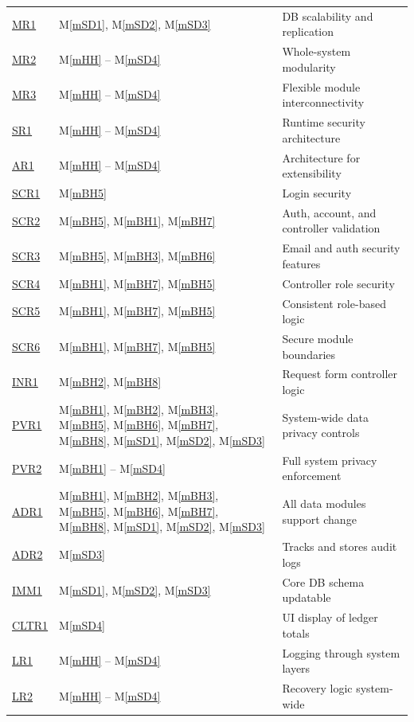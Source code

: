 \documentclass[12pt, titlepage]{article}
\newcommand{\mref}[1]{M\ref{#1}}
\begin{document}
\begin{longtable}{p{} p{} p{}}
\href{../../SRS/SRS.pdf#FROneOne}{ MR1 } & \mref{mSD1}, \mref{mSD2}, \mref{mSD3} & DB scalability and replication \\
\href{../../SRS/SRS.pdf#FROneOne}{ MR2 } & \mref{mHH} – \mref{mSD4} & Whole-system modularity \\
\href{../../SRS/SRS.pdf#FROneOne}{ MR3 } & \mref{mHH} – \mref{mSD4} & Flexible module interconnectivity \\
\href{../../SRS/SRS.pdf#FROneOne}{ SR1 } & \mref{mHH} – \mref{mSD4} & Runtime security architecture \\
\href{../../SRS/SRS.pdf#FROneOne}{ AR1 } & \mref{mHH} – \mref{mSD4} & Architecture for extensibility \\
\href{../../SRS/SRS.pdf#FROneOne}{ SCR1 } & \mref{mBH5} & Login security \\
\href{../../SRS/SRS.pdf#FROneOne}{ SCR2 } & \mref{mBH5}, \mref{mBH1}, \mref{mBH7} & Auth, account, and controller validation \\
\href{../../SRS/SRS.pdf#FROneOne}{ SCR3 } & \mref{mBH5}, \mref{mBH3}, \mref{mBH6} & Email and auth security features \\
\href{../../SRS/SRS.pdf#FROneOne}{ SCR4 } & \mref{mBH1}, \mref{mBH7}, \mref{mBH5} & Controller role security \\
\href{../../SRS/SRS.pdf#FROneOne}{ SCR5 } & \mref{mBH1}, \mref{mBH7}, \mref{mBH5} & Consistent role-based logic \\
\href{../../SRS/SRS.pdf#FROneOne}{ SCR6 } & \mref{mBH1}, \mref{mBH7}, \mref{mBH5} & Secure module boundaries \\
\href{../../SRS/SRS.pdf#FROneOne}{ INR1 } & \mref{mBH2}, \mref{mBH8} & Request form controller logic \\
\href{../../SRS/SRS.pdf#FROneOne}{ PVR1 } & \mref{mBH1}, \mref{mBH2}, \mref{mBH3}, \mref{mBH5}, \mref{mBH6}, \mref{mBH7}, \mref{mBH8}, \mref{mSD1}, \mref{mSD2}, \mref{mSD3} & System-wide data privacy controls \\
\href{../../SRS/SRS.pdf#FROneOne}{ PVR2 } & \mref{mBH1} – \mref{mSD4} & Full system privacy enforcement \\
\href{../../SRS/SRS.pdf#FROneOne}{ ADR1 } & \mref{mBH1}, \mref{mBH2}, \mref{mBH3}, \mref{mBH5}, \mref{mBH6}, \mref{mBH7}, \mref{mBH8}, \mref{mSD1}, \mref{mSD2}, \mref{mSD3} & All data modules support change \\
\href{../../SRS/SRS.pdf#FROneOne}{ ADR2 } & \mref{mSD3} & Tracks and stores audit logs \\
\href{../../SRS/SRS.pdf#FROneOne}{ IMM1 } & \mref{mSD1}, \mref{mSD2}, \mref{mSD3} & Core DB schema updatable \\
\href{../../SRS/SRS.pdf#FROneOne}{ CLTR1 } & \mref{mSD4} & UI display of ledger totals \\
\href{../../SRS/SRS.pdf#FROneOne}{ LR1 } & \mref{mHH} – \mref{mSD4} & Logging through system layers \\
\href{../../SRS/SRS.pdf#FROneOne}{ LR2 } & \mref{mHH} – \mref{mSD4} & Recovery logic system-wide \\

\end{longtable}
\end{document}
